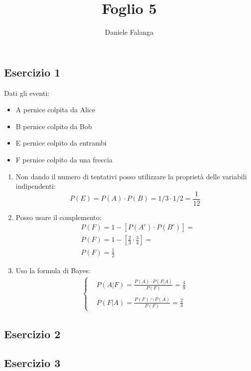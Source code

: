 \documentclass[12pt]{article}
\title{\textbf{Foglio 5}}
\author{Daniele Falanga}
\date{}
\begin{document}
\maketitle

\subsection*{Esercizio 1}
Dati gli eventi:
\begin{itemize}
    \item A pernice colpita da Alice
    \item B pernice colpito da Bob
    \item E pernice colpito da entrambi
    \item F pernice colpito da una freccia
\end{itemize}
\begin{enumerate}
    \item Non dando il numero di tentativi posso utilizzare la proprietà delle variabili indipendenti:
    \[
    P(E) = P(A)\cdot P(B) = 1/3 \cdot 1/2 = \frac{1}{12}   
    \]
    \item Posso usare il complemento:
    \begin{align*}
        &P(F) = 1-[P(A^c) \cdot P(B^c)] = \\
        &P(F) = 1 - \left[ \frac{2}{3} \cdot \frac{3}{4}\right] = \\
        &P(F) = \frac{1}{2}
    \end{align*}
    \item Uso la formula di Bayes:
    \begin{align*}
        \begin{cases}
            &P(A|F) = \frac{P(A)\cdot P(F|A)}{P(F)}  = \frac{4}{9}\\
            & \\
            &P(F|A) = \frac{P(F) \cap P(A)}{P(F)} = \frac{2}{3}
        \end{cases}
    \end{align*}    
\end{enumerate}


\subsection*{Esercizio 2}



\subsection*{Esercizio 3}
\end{document}
